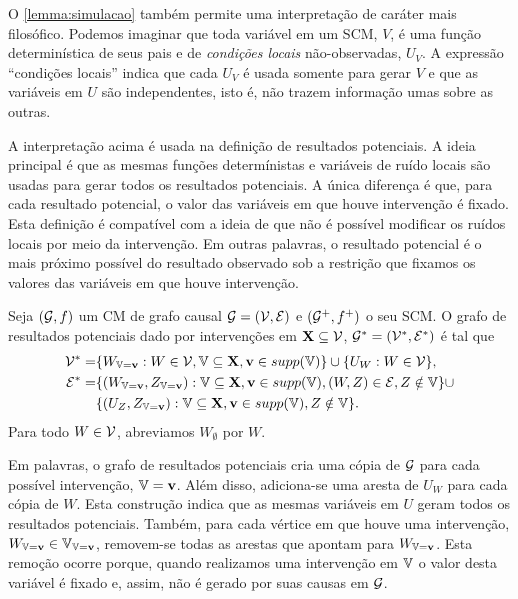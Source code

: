 O \cref{lemma:simulacao} também permite
uma interpretação de caráter mais filosófico.
Podemos imaginar que toda variável em um SCM, $V$, é
uma função determinística de seus pais e
de \textit{condições locais} não-observadas, $U_V$.
A expressão ``condições locais'' indica que
cada $U_V$ é usada somente para gerar $V$ e que
as variáveis em $U$ são independentes, isto é,
não trazem informação umas sobre as outras.

A interpretação acima é usada
na definição de resultados potenciais.
A ideia principal é que 
as mesmas funções determínistas e
variáveis de ruído locais são usadas
para gerar todos os resultados potenciais.
A única diferença é que,
para cada resultado potencial,
o valor das variáveis em que 
houve intervenção é fixado.
Esta definição é compatível com 
a ideia de que não é possível modificar
os ruídos locais por meio da intervenção.
Em outras palavras, 
o resultado potencial é o mais próximo possível
do resultado observado sob a restrição que
fixamos os valores das variáveis em que
houve intervenção.

\begin{definition}
 \label{def:grafo_potencial}
 Seja $({\mathcal G}, f)$ um CM de grafo causal 
 ${\mathcal G} = ({\mathcal V}, {\mathcal E})$ e
 $({\mathcal G}^+, f^+)$ o seu SCM.
 O grafo de resultados potenciais dado
 por intervenções em ${\mathbf{X}} \subseteq {\mathcal V}$,
 ${\mathcal G}^* = ({\mathcal V}^*, {\mathcal E}^*)$ é tal que
 \begin{align*}
  {\mathcal V}^* =& \{W_{{\mathbb V}={\mathbf{v}}}: W \in {\mathcal V}, {\mathbb V} \subseteq {\mathbf{X}}, {\mathbf{v}} \in supp({\mathbb V})\} \cup \{U_W: W \in {\mathcal V}\}, \\
  {\mathcal E}^* =& \{(W_{{\mathbb V}={\mathbf{v}}}, Z_{{\mathbb V}={\mathbf{v}}}): {\mathbb V} \subseteq {\mathbf{X}}, {\mathbf{v}} \in supp({\mathbb V}),
  (W, Z) \in {\mathcal E}, Z \notin {\mathbb V}\} \cup \\
  &\{(U_Z, Z_{{\mathbb V}={\mathbf{v}}}): {\mathbb V} \subseteq {\mathbf{X}}, {\mathbf{v}} \in supp({\mathbb V}), Z \notin {\mathbb V} \} .
 \end{align*}
 Para todo $W \in {\mathcal V}$, abreviamos $W_{\emptyset}$ por $W$.
\end{definition}
 
Em palavras, o grafo de resultados potenciais cria 
uma cópia de ${\mathcal G}$ para cada possível intervenção, ${\mathbb V}={\mathbf{v}}$.
Além disso, adiciona-se uma aresta de $U_W$ para cada cópia de $W$.
Esta construção indica que as mesmas variáveis em $U$
geram todos os resultados potenciais.
Também, para cada vértice em que 
houve uma intervenção,
$W_{{\mathbb V}={\mathbf{v}}} \in {\mathbb V}_{{\mathbb V}={\mathbf{v}}}$, removem-se 
todas as arestas que apontam para $W_{{\mathbb V}={\mathbf{v}}}$.
Esta remoção ocorre porque, 
quando realizamos uma intervenção em ${\mathbb V}$
o valor desta variável é fixado e, assim,
não é gerado por suas causas em ${\mathcal G}$.

